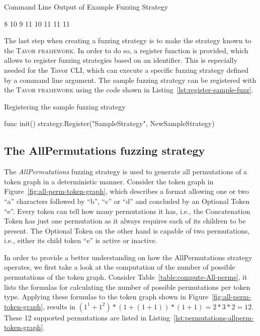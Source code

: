 \begin{listing}
\caption{Command Line Output of Example Fuzzing Strategy}
\label{lst:output-example-fuzz}
\begin{gocode}
8 10
9 11
10 11
11 11
\end{gocode}
\end{listing}

The last step when creating a fuzzing strategy is to make the strategy known to the \textsc{Tavor framework}. In order to do so, a register function is provided, which allows to register fuzzing strategies based on an identifier. This is especially needed for the Tavor CLI, which can execute a specific fuzzing strategy defined by a command line argument. The sample fuzzing strategy can be registered with the \textsc{Tavor framework} using the code shown in Listing~\ref{lst:register-sample-fuzz}.

\begin{listing}
\caption{Registering the sample fuzzing strategy}
\label{lst:register-sample-fuzz}
\begin{gocode}
func init() {
	strategy.Register("SampleStrategy", NewSampleStrategy)
}
\end{gocode}
\end{listing}

\subsection{The AllPermutations fuzzing strategy}
\label{sec:all-perm-fuzz-strategy}

The \emph{AllPermutations} fuzzing strategy is used to generate all permutations of a token graph in a deterministic manner. Consider the token graph in Figure~\ref{fig:all-perm-token-graph}, which describes a format allowing one or two \enquote{a} characters followed by \enquote{b}, \enquote{c} or \enquote{d} and concluded by an Optional Token \enquote{e}. Every token can tell how many permutations it has, i.e., the Concatenation Token has just one permutation as it always requires each of its children to be present. The Optional Token on the other hand is capable of two permutations, i.e., either its child token \enquote{e} is active or inactive.

In order to provide a better understanding on how the AllPermutations strategy operates, we first take a look at the computation of the number of possible permutations of the token graph. Consider Table~\ref{table:compute-All-perms}, it lists the formulas for calculating the number of possible permutations per token type. Applying these formulas to the token graph shown in Figure~\ref{fig:all-perm-token-graph}, results in $(1^1+1^2)*(1+(1+1))*(1+1) = 2 * 3 * 2 = 12$. These 12 supported permutations are listed in Listing~\ref{lst:permutations-allperm-token-graph}.

